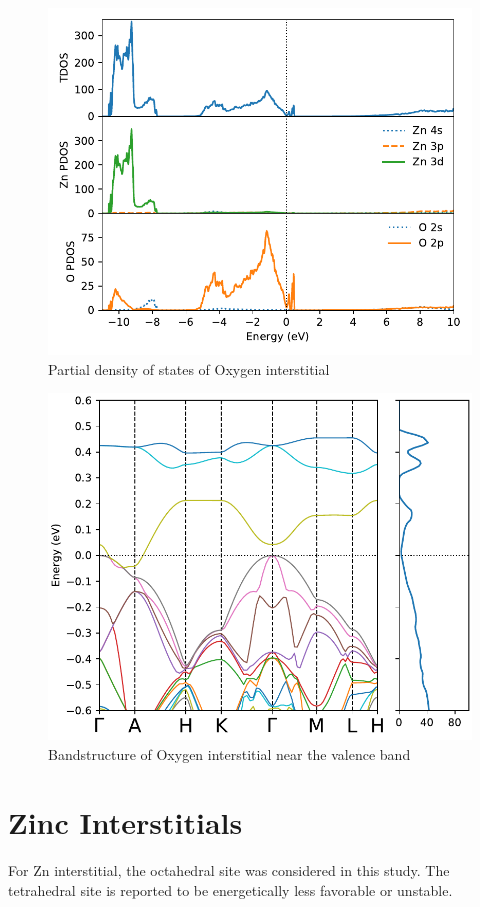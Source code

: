 \begin{figure}[tbh!]
	\centering
	\includegraphics[width=0.6\linewidth]{"images/rnd/dos-pdos_O_i"}
	\caption[Partial density of states of Oxygen interstitial]{Partial density of states of Oxygen interstitial}
\end{figure}

\begin{figure}[tbh!]
	\centering
	\includegraphics[width=0.6\linewidth]{"images/rnd/band-dos-close_O_i"}
	\caption[Bandstructure of Oxygen interstitial near the valence band]{Bandstructure of Oxygen interstitial near the valence band}
\end{figure}

\clearpage

\section{Zinc Interstitials}

For Zn interstitial, the octahedral site was considered in this study. The tetrahedral site is reported to be energetically less favorable or unstable. 

